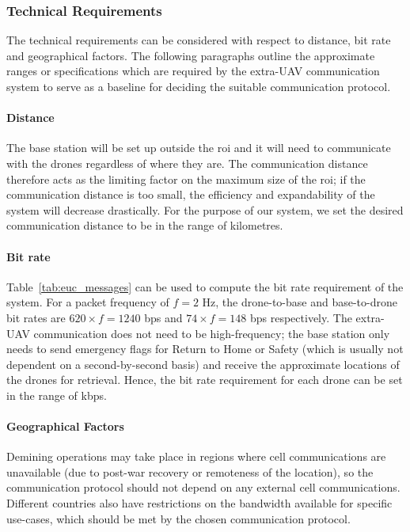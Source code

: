 \subsubsection{Technical Requirements}

The technical requirements can be considered with respect to distance, bit rate and geographical factors. The following paragraphs outline the approximate ranges or specifications which are required by the extra-\gls{UAV} communication system to serve as a baseline for deciding the suitable communication protocol.

\paragraph{Distance} The base station will be set up outside the \gls{roi} and it will need to communicate with the drones regardless of where they are. The communication distance therefore acts as the limiting factor on the maximum size of the \gls{roi}; if the communication distance is too small, the efficiency and expandability of the system will decrease drastically. For the purpose of our system, we set the desired communication distance to be in the range of kilometres. 

\paragraph{Bit rate} Table~\ref{tab:euc_messages} can be used to compute the bit rate requirement of the system. For a packet frequency of $f=2$ Hz, the drone-to-base and base-to-drone bit rates are $620 \times f=1240$ bps and $74 \times f=148$ bps respectively. The extra-\gls{UAV} communication does not need to be high-frequency; the base station only needs to send emergency flags for Return to Home or Safety (which is usually not dependent on a second-by-second basis) and receive the approximate locations of the drones for retrieval. Hence, the bit rate requirement for each drone can be set in the range of kbps. 

\paragraph{Geographical Factors} Demining operations may take place in regions where cell communications are unavailable (due to post-war recovery or remoteness of the location), so the communication protocol should not depend on any external cell communications. Different countries also have restrictions on the bandwidth available for specific use-cases, which should be met by the chosen communication protocol. 

